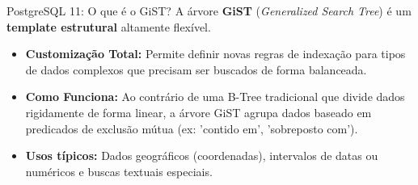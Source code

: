 \documentclass[9pt]{beamer}
\begin{document}
\begin{frame}{PostgreSQL 11: O que é o GiST?}
    A árvore \textbf{GiST} (\textit{Generalized Search Tree}) é um \textbf{template estrutural} altamente flexível.
    
    \vspace{0.3cm}
    \begin{itemize}
        \item \textbf{Customização Total:} Permite definir novas regras de indexação para tipos de dados complexos que precisam ser buscados de forma balanceada.
        \item \textbf{Como Funciona:} Ao contrário de uma B-Tree tradicional que divide dados rigidamente de forma linear, a árvore GiST agrupa dados baseado em predicados de exclusão mútua (ex: 'contido em', 'sobreposto com').
        \item \textbf{Usos típicos:} Dados geográficos (coordenadas), intervalos de datas ou numéricos e buscas textuais especiais.
    \end{itemize}
\end{frame}
\end{document}

